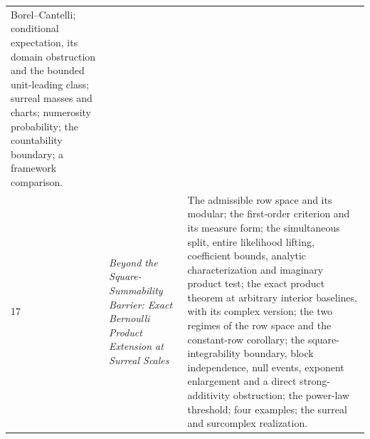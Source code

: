 \documentclass[11pt]{article}
\numberwithin{equation}{section}
\theoremstyle{definition}
\theoremstyle{remark}
\begin{document}
\begin{center}
\begin{tabularx}{\textwidth}{@{}p{}>{\raggedright\arraybackslash}p{}>{\raggedright\arraybackslash}X@{}}
Borel--Cantelli; conditional expectation, its domain obstruction and the bounded
unit-leading class; surreal masses and charts; numerosity probability; the
countability boundary; a framework comparison.\\[3pt]
17 & \emph{Beyond the Square-Summability Barrier: Exact Bernoulli Product
Extension at Surreal Scales} &
The admissible row space and its modular; the first-order criterion and its
measure form; the simultaneous split, entire likelihood lifting, coefficient
bounds, analytic characterization and imaginary product test; the exact product
theorem at arbitrary interior baselines, with its complex version; the two
regimes of the row space and the constant-row corollary; the square-integrability
boundary, block independence, null events, exponent enlargement and a direct
strong-additivity obstruction; the power-law threshold; four examples; the surreal
and surcomplex realization.\\
\bottomrule
\end{tabularx}
\end{center}
\end{document}
